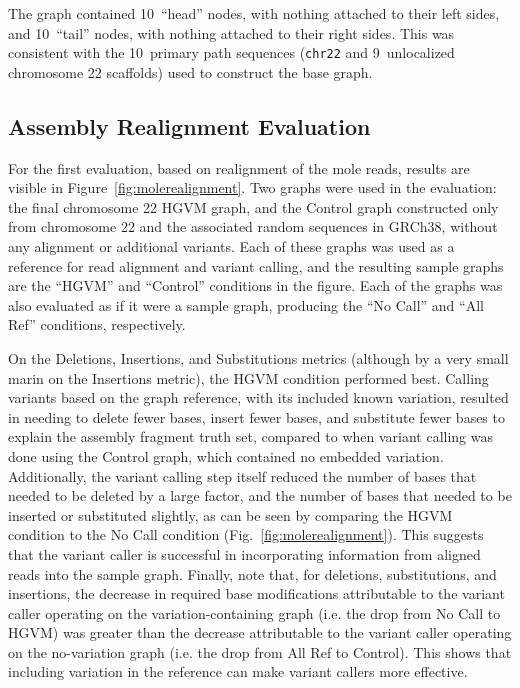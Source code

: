 The graph contained 10~``head'' nodes, with nothing attached to their left sides, and 10~``tail'' nodes, with nothing attached to their right sides. This was consistent with the 10~primary path sequences (\texttt{chr22} and 9~unlocalized chromosome 22 scaffolds) used to construct the base graph.

\subsection{Assembly Realignment Evaluation}
\label{subsec:assemblyrealignmenteval}

For the first evaluation, based on realignment of the mole reads, results are visible in Figure~\ref{fig:molerealignment}. Two graphs were used in the evaluation: the final chromosome 22 HGVM graph, and the Control graph constructed only from chromosome 22 and the associated random sequences in GRCh38, without any alignment or additional variants. Each of these graphs was used as a reference for read alignment and variant calling, and the resulting sample graphs are the ``HGVM'' and ``Control'' conditions in the figure. Each of the graphs was also evaluated as if it were a sample graph, producing the ``No Call'' and ``All Ref'' conditions, respectively.

On the Deletions, Insertions, and Substitutions metrics (although by a very small marin on the Insertions metric), the HGVM condition performed best. Calling variants based on the graph reference, with its included known variation, resulted in needing to delete fewer bases, insert fewer bases, and substitute fewer bases to explain the assembly fragment truth set, compared to when variant calling was done using the Control graph, which contained no embedded variation. Additionally, the variant calling step itself reduced the number of bases that needed to be deleted by a large factor, and the number of bases that needed to be inserted or substituted slightly, as can be seen by comparing the HGVM condition to the No Call condition (Fig.~\ref{fig:molerealignment}). This suggests that the variant caller is successful in incorporating information from aligned reads into the sample graph. Finally, note that, for deletions, substitutions, and insertions, the decrease in required base modifications attributable to the variant caller operating on the variation-containing graph (i.e. the drop from No Call to HGVM) was greater than the decrease attributable to the variant caller operating on the no-variation graph (i.e. the drop from All Ref to Control). This shows that including variation in the reference can make variant callers more effective.

